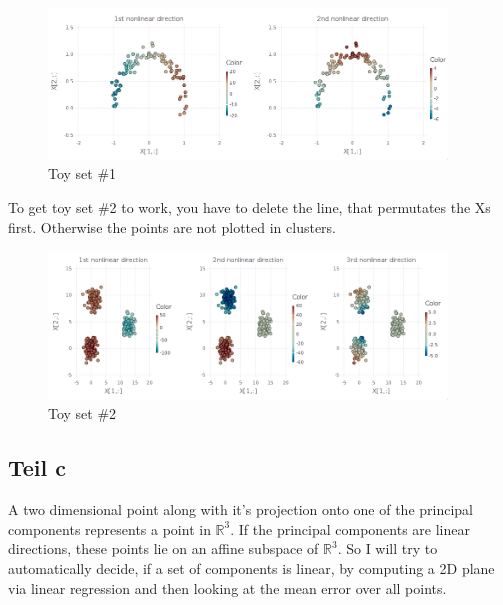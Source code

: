 \documentclass[10pt,a4paper]{article}
\begin{document}
\begin{figure}[h!]
  \centering
  \includegraphics[width=300pt]{7_2_b_1}
  \caption{Toy set \#1}
\end{figure}
To get toy set \#2 to work, you have to delete the line, that permutates the Xs
first. Otherwise the points are not plotted in clusters.
\begin{figure}[h!]
  \centering
  \includegraphics[width=300pt]{7_2_b_2}
  \caption{Toy set \#2}
\end{figure}

\subsection{Teil c}

A two dimensional point along with it's projection onto one of the principal
components represents a point in $\mathbb{R}^{3}$. If the principal components
are linear directions, these points lie on an affine subspace of
$\mathbb{R}^{3}$. So I will try to automatically decide, if a set of components
is linear, by computing a 2D plane via linear regression and then looking at the
mean error over all points.
\end{document}
